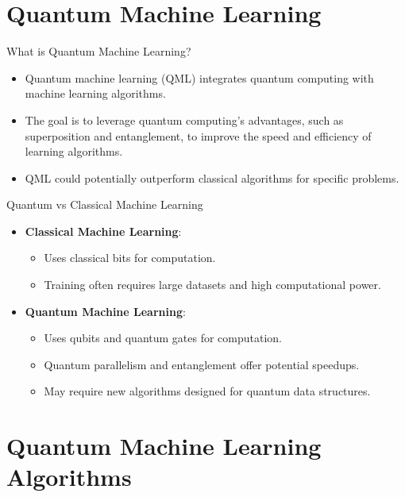 \documentclass{beamer}
\begin{document}
\section{Quantum Machine Learning}

\begin{frame}{What is Quantum Machine Learning?}
    \begin{itemize}
        \item Quantum machine learning (QML) integrates quantum computing with machine learning algorithms.
        \item The goal is to leverage quantum computing's advantages, such as superposition and entanglement, to improve the speed and efficiency of learning algorithms.
        \item QML could potentially outperform classical algorithms for specific problems.
    \end{itemize}
\end{frame}

\begin{frame}{Quantum vs Classical Machine Learning}
    \begin{itemize}
        \item \textbf{Classical Machine Learning}: 
        \begin{itemize}
            \item Uses classical bits for computation.
            \item Training often requires large datasets and high computational power.
        \end{itemize}
        \item \textbf{Quantum Machine Learning}:
        \begin{itemize}
            \item Uses qubits and quantum gates for computation.
            \item Quantum parallelism and entanglement offer potential speedups.
            \item May require new algorithms designed for quantum data structures.
        \end{itemize}
    \end{itemize}
\end{frame}

\section{Quantum Machine Learning Algorithms}
\end{document}
